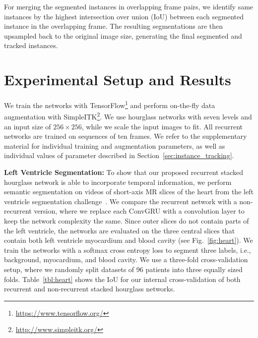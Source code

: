 \documentclass[runningheads,a4paper]{llncs}
\begin{document}
For merging the segmented instances in overlapping frame pairs, we identify same instances by the highest intersection over union (IoU) between each segmented instance in the overlapping frame.
The resulting segmentations are then upsampled back to the original image size, generating the final segmented and tracked instances.

\section{Experimental Setup and Results}
\label{sec:setup}

We train the networks with TensorFlow\footnote{\url{https://www.tensorflow.org/}} and perform on-the-fly data augmentation with SimpleITK\footnote{\url{http://www.simpleitk.org/}}.
We use hourglass networks with seven levels and an input size of $256\times256$, while we scale the input images to fit.
All recurrent networks are trained on sequences of ten frames.
We refer to the supplementary material for individual training and augmentation parameters, as well as individual values of parameter described in Section~\ref{sec:instance_tracking}.

\noindent\textbf{Left Ventricle Segmentation:}
To show that our proposed recurrent stacked hourglass network is able to incorporate temporal information, we perform semantic segmentation on videos of short-axis MR slices of the heart from the left ventricle segmentation challenge~\cite{Suinesiaputra2014}.
We compare the recurrent network with a non-recurrent version, where we replace each \mbox{ConvGRU} with a convolution layer to keep the network complexity the same.
Since outer slices do not contain parts of the left ventricle, the networks are evaluated on the three central slices that contain both left ventricle myocardium and blood cavity (see Fig.~\ref{fig:heart}). %
We train the networks with a softmax cross entropy loss to segment three labels, i.e., background, myocardium, and blood cavity.
We use a three-fold cross-validation setup, where we randomly split datasets of 96 patients into three equally sized folds.
Table~\ref{tbl:heart} shows the IoU for our internal cross-validation of both recurrent and non-recurrent stacked hourglass networks.
\end{document}
